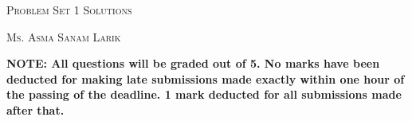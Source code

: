 \documentclass[11pt, article, oneside]{memoir}
\newcommand{\set}[1]{\{\, #1\, \}}
\begin{document}
\begin{center}
\LARGE{\textsc{Problem Set 1 Solutions}}
 
\large{\textsc{Ms. Asma Sanam Larik}}
\end{center}

\textbf{NOTE: All questions will be graded out of 5. No marks have been deducted for making late submissions made exactly within one hour of the passing of the deadline. 1 mark deducted for all submissions made after that.}

        
        
        

        
\end{document}

